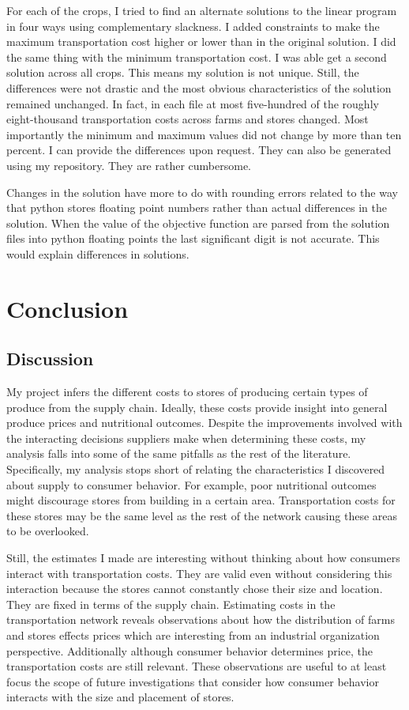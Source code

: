 \documentclass{report}
\begin{document}
For each of the crops, I tried to find an alternate solutions to the linear program in four ways using complementary slackness. I added constraints to make the maximum transportation cost higher or lower than in the original solution. I did the same thing with the minimum transportation cost. I was able get a second solution across all crops. This means my solution is not unique. Still, the differences were not drastic and the most obvious characteristics of the solution remained unchanged. In fact, in each file at most five-hundred of the roughly eight-thousand transportation costs across farms and stores changed. Most importantly the minimum and maximum values did not change by more than ten percent. I can provide the differences upon request. They can also be generated using my repository. They are rather cumbersome.

Changes in the solution have more to do with rounding errors related to the way that python stores floating point numbers rather than actual differences in the solution. When the value of the objective function are parsed from the solution files into python floating points the last significant digit is not accurate. This would explain differences in solutions.

\chapter{Conclusion}

\section{Discussion}

My project infers the different costs to stores of producing certain types of produce from the supply chain. Ideally, these costs provide insight into general produce prices and nutritional outcomes. Despite the improvements involved with the interacting decisions suppliers make when determining these costs, my analysis falls into some of the same pitfalls as the rest of the literature. Specifically, my analysis stops short of relating the characteristics I discovered about supply to consumer behavior. For example, poor nutritional outcomes might discourage stores from building in a certain area. Transportation costs for these stores may be the same level as the rest of the network causing these areas to be overlooked.

Still, the estimates I made are interesting without thinking about how consumers interact with transportation costs. They are valid even without considering this interaction because the stores cannot constantly chose their size and location. They are fixed in terms of the supply chain. Estimating costs in the transportation network reveals observations about how the distribution of farms and stores effects prices which are interesting from an industrial organization perspective. Additionally although consumer behavior determines price, the transportation costs are still relevant. These observations are useful to at least focus the scope of future investigations that consider how consumer behavior interacts with the size and placement of stores.
\end{document}
